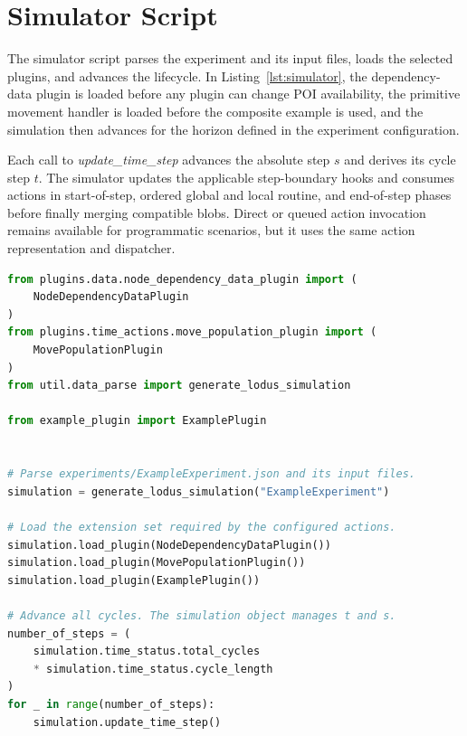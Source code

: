 \section{Simulator Script}
\label{app:simulator}

The simulator script parses the experiment and its input files, loads the
selected plugins, and advances the lifecycle. In
Listing~\ref{lst:simulator}, the dependency-data plugin is loaded before any
plugin can change POI availability, the primitive movement handler is loaded
before the composite example is used, and the simulation then advances for the
horizon defined in the experiment configuration.

Each call to \textit{update\_time\_step} advances the absolute step $s$ and
derives its cycle step $t$. The simulator updates the applicable step-boundary
hooks and consumes actions in start-of-step, ordered global and local routine,
and end-of-step phases before finally merging compatible blobs. Direct or
queued action invocation remains available for programmatic scenarios, but it
uses the same action representation and dispatcher.

\begin{lstlisting}[language={Python},
caption={Example of a simulator script using the revised lifecycle.},
captionpos=b, label={lst:simulator}, basicstyle=\scriptsize]
from plugins.data.node_dependency_data_plugin import (
    NodeDependencyDataPlugin
)
from plugins.time_actions.move_population_plugin import (
    MovePopulationPlugin
)
from util.data_parse import generate_lodus_simulation

from example_plugin import ExamplePlugin


# Parse experiments/ExampleExperiment.json and its input files.
simulation = generate_lodus_simulation("ExampleExperiment")

# Load the extension set required by the configured actions.
simulation.load_plugin(NodeDependencyDataPlugin())
simulation.load_plugin(MovePopulationPlugin())
simulation.load_plugin(ExamplePlugin())

# Advance all cycles. The simulation object manages t and s.
number_of_steps = (
    simulation.time_status.total_cycles
    * simulation.time_status.cycle_length
)
for _ in range(number_of_steps):
    simulation.update_time_step()
\end{lstlisting}
